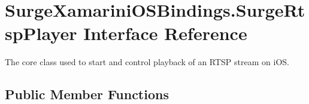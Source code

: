\hypertarget{interface_surge_xamarini_o_s_bindings_1_1_surge_rtsp_player}{}\section{Surge\+Xamarini\+O\+S\+Bindings.\+Surge\+Rtsp\+Player Interface Reference}
\label{interface_surge_xamarini_o_s_bindings_1_1_surge_rtsp_player}


The core class used to start and control playback of an R\+T\+SP stream on i\+OS.  


\subsection*{Public Member Functions}
